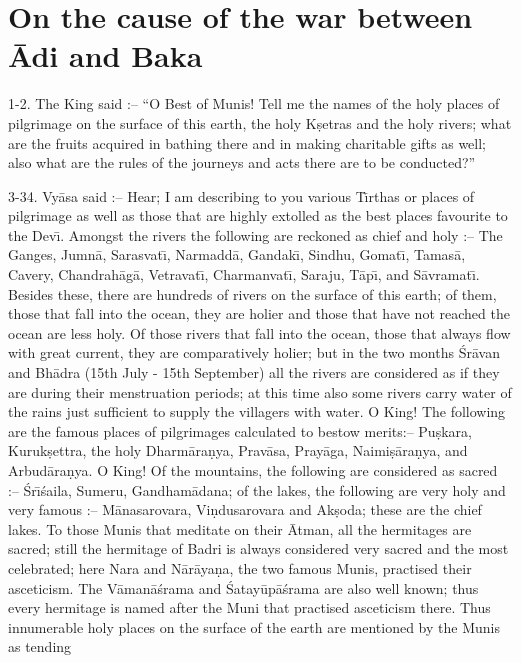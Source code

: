 \chapter{On the cause of the war between \=Adi and Baka}

1-2. The King said :-- ``O Best of Munis! Tell me the names of the holy places of pilgrimage on the surface of this earth, the holy K\d{s}etras and the holy rivers; what are the fruits acquired in bathing there and in making charitable gifts as well; also what are the rules of the journeys and acts there are to be conducted?''

3-34. Vy\=asa said :-- Hear; I am describing to you various T\={\i}rthas or places of pilgrimage as well as those that are highly extolled as the best places favourite to the Dev\={\i}. Amongst the rivers the following are reckoned as chief and holy :-- The Ganges, Jumn\=a, Sarasvat\={\i}, Narmadd\=a, Gandak\={\i}, Sindhu, Gomat\={\i}, Tamas\=a, Cavery, Chandrah\=ag\=a, Vetravat\={\i}, Charmanvat\={\i}, Saraju, T\=ap\={\i}, and S\=avramat\={\i}. Besides these, there are hundreds of rivers on the surface of this earth; of them, those that fall into the ocean, they are holier and those that have not reached the ocean are less holy. Of those rivers that fall into the ocean, those that always flow with great current, they are comparatively holier; but in the two months \'Sr\=avan and Bh\=adra (15th July - 15th September) all the rivers are considered as if they are during their menstruation periods; at this time also some rivers carry water of the rains just sufficient to supply the villagers with water. O King! The following are the famous places of pilgrimages calculated to bestow merits:-- Pu\d{s}kara, Kuruk\d{s}ettra, the holy Dharm\=ara\d{n}ya, Prav\=asa, Pray\=aga, Naimi\d{s}\=ara\d{n}ya, and Arbud\=ara\d{n}ya. O King! Of the mountains, the following are considered as sacred :-- \'Sr\={\i}\'saila, Sumeru, Gandham\=adana; of the lakes, the following are very holy and very famous :-- M\=anasarovara, Vi\d{n}dusarovara and Ak\d{s}oda; these are the chief lakes. To those Munis that meditate on their \=Atman, all the hermitages are sacred; still the hermitage of Badri is always considered very sacred and the most celebrated; here Nara and N\=ar\=aya\d{n}a, the two famous Munis, practised their asceticism. The V\=aman\=a\'srama and \'Satay\=up\=a\'srama are also well known; thus every hermitage is named after the Muni that practised asceticism there. Thus innumerable holy places on the surface of the earth are mentioned by the Munis as tending

